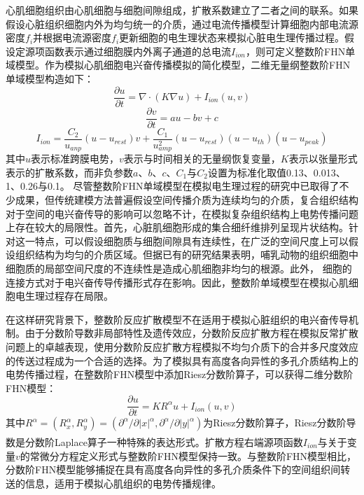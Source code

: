 \documentclass[twoside,UTF8]{nputhesis}
\newcommand{\upcite}[1]{\textsuperscript{\textsuperscript{\cite{#1}}}}
\begin{document}
心肌细胞组织由心肌细胞与细胞间隙组成，扩散系数建立了二者之间的联系。如果假设心脏组织细胞内外为均匀统一的介质，通过电流传播模型计算细胞内部电流源密度$f_{i}$并根据电流源密度$f_{i}$更新细胞的电生理状态来模拟心脏电生理传播过程。假设定源项函数表示通过细胞膜内外离子通道的总电流$I_{ion}$，则可定义整数阶FHN单域模型。作为模拟心肌细胞电兴奋传播模拟的简化模型，二维无量纲整数阶FHN单域模型构造如下：
\begin{equation}
\frac{\partial u}{\partial t}=\nabla \cdot(K \nabla u)+I_{i o n}(u, v)
\end{equation}
\begin{equation}
\frac{\partial v}{\partial t}=a u-b v+c
\end{equation}
\begin{equation}
I_{i o n}=\frac{C_{2}}{u_{a n p}}\left(u-u_{r e s t}\right) v+\frac{C_{1}}{u_{a m p}^{2}}\left(u-u_{r e s t}\right)\left(u-u_{t h}\right)\left(u-u_{p e a k}\right)
\end{equation}
其中$u$表示标准跨膜电势，$v$表示与时间相关的无量纲恢复变量，$K$表示以张量形式表示的扩散系数，而非负参数$a$、$b$、$c$、$C_{1}$与$C_{2}$设置为标准化取值0.13、0.013、1、0.26与0.1。
尽管整数阶FHN单域模型在模拟电生理过程的研究中已取得了不少成果，但传统建模方法普遍假设空间传播介质为连续均匀的介质，复合组织结构对于空间的电兴奋传导的影响可以忽略不计，在模拟复杂组织结构上电势传播问题上存在较大的局限性。首先，心脏肌细胞形成的集合细纤维排列呈现片状结构。针对这一特点，可以假设细胞质与细胞间隙具有连续性，在广泛的空间尺度上可以假设组织结构为均匀的介质区域。但据已有的研究结果表明，哺乳动物的组织细胞中细胞质的局部空间尺度的不连续性是造成心肌细胞非均匀的根源。此外， 细胞的连接方式对于电兴奋传导传播形式存在影响。因此，整数阶单域模型在模拟心肌细胞电生理过程存在局限。

在这样研究背景下，整数阶反应扩散模型不在适用于模拟心脏组织的电兴奋传导机制。由于分数阶导数非局部特性及遗传效应，分数阶反应扩散方程在模拟反常扩散问题上的卓越表现，使用分数阶反应扩散方程模拟不均匀介质下的合并多尺度效应的传送过程成为一个合适的选择。为了模拟具有高度各向异性的多孔介质结构上的电势传播过程，在整数阶FHN模型中添加Riesz分数阶算子，可以获得二维分数阶FHN模型：
\begin{equation}
\frac{\partial u}{\partial t}=K R^{\alpha} u+I_{ion}(u, v)
\end{equation}
其中$R^{\alpha}=\left(R_{x}^{\alpha}, R_{y}^{\alpha}\right)=\left(\partial^{\alpha} / \partial|x|^{\alpha}, \partial^{\alpha} / \partial|y|^{\alpha}\right)$为Riesz分数阶算子，Riesz分数阶导数是分数阶Laplace算子一种特殊的表达形式\upcite{zhang2018riesz}。扩散方程右端源项函数$I_{ion}$与关于变量$v$的常微分方程定义形式与整数阶FHN模型保持一致。与整数阶FHN模型相比，分数阶FHN模型能够捕捉在具有高度各向异性的多孔介质条件下的空间组织间转送的信息，适用于模拟心肌组织的电势传播规律。
\end{document}
